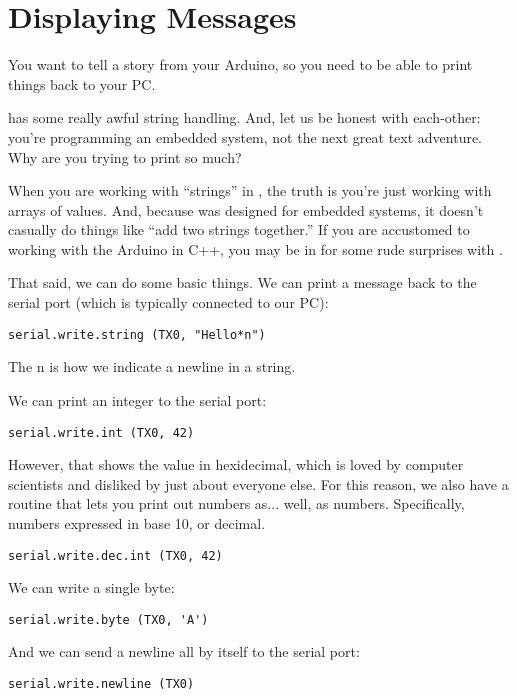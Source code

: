 \section{Displaying Messages}
\problem
You want to tell a story from your Arduino, so you need to be able to print things back to your PC.

\solution
\occam has some really awful string handling. And, let us be honest with each-other: you're programming an embedded system, not the next great text adventure. Why are you trying to print so much?

When you are working with ``strings'' in \occam, the truth is you're just working with arrays of \BYTE values. And, because \occam was designed for embedded systems, it doesn't casually do things like ``add two strings together.'' If you are accustomed to working with the Arduino in C++, you may be in for some rude surprises with \occam. 

That said, we can do some basic things. We can print a message back to the serial port (which is typically connected to our PC):

\begin{lstlisting}
serial.write.string (TX0, "Hello*n")
\end{lstlisting}

The {\code *n} is how we indicate a newline in a string. 

We can print an integer to the serial port:

\begin{lstlisting}
serial.write.int (TX0, 42)
\end{lstlisting}

However, that shows the value in hexidecimal, which is loved by computer scientists and disliked by just about everyone else. For this reason, we also have a routine that lets you print out numbers as... well, as numbers. Specifically, numbers expressed in base 10, or decimal.

\begin{lstlisting}
serial.write.dec.int (TX0, 42)
\end{lstlisting}

We can write a single byte:

\begin{lstlisting}
serial.write.byte (TX0, 'A')
\end{lstlisting}

And we can send a newline all by itself to the serial port:

\begin{lstlisting}
serial.write.newline (TX0)
\end{lstlisting}

